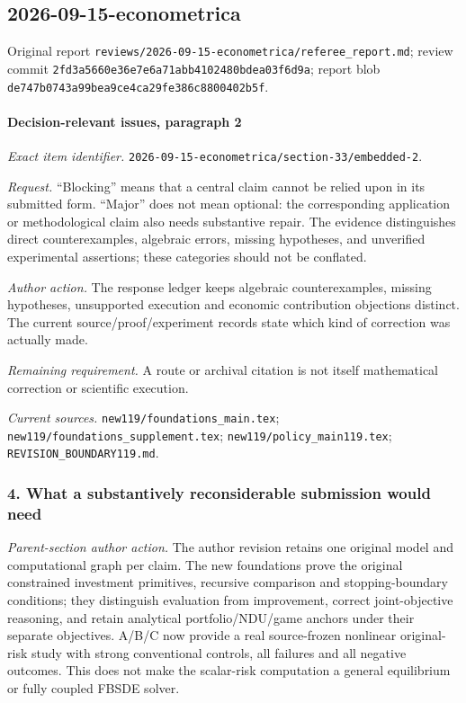 \subsection{2026-09-15-econometrica}

Original report \nolinkurl{reviews/2026-09-15-econometrica/referee_report.md}; review commit \nolinkurl{2fd3a5660e36e7e6a71abb4102480bdea03f6d9a}; report blob \nolinkurl{de747b0743a99bea9ce4ca29fe386c8800402b5f}.

\paragraph{Decision-relevant issues, paragraph 2}

\emph{Exact item identifier.} \nolinkurl{2026-09-15-econometrica/section-33/embedded-2}.

\par\emph{Request.} “Blocking” means that a central claim cannot be relied upon in its submitted form. “Major” does not mean optional: the corresponding application or methodological claim also needs substantive repair. The evidence distinguishes direct counterexamples, algebraic errors, missing hypotheses, and unverified experimental assertions; these categories should not be conflated.

\par\emph{Author action.} The response ledger keeps algebraic counterexamples, missing hypotheses, unsupported execution and economic contribution objections distinct. The current source/\allowbreak{}proof/\allowbreak{}experiment records state which kind of correction was actually made.

\par\emph{Remaining requirement.} A route or archival citation is not itself mathematical correction or scientific execution.

\par\emph{Current sources.} \nolinkurl{new119/foundations_main.tex}; \nolinkurl{new119/foundations_supplement.tex}; \nolinkurl{new119/policy_main119.tex}; \nolinkurl{REVISION_BOUNDARY119.md}.

\subsubsection{4. What a substantively reconsiderable submission would need}

\emph{Parent-section author action.} The author revision retains one original model and computational graph per claim. The new foundations prove the original constrained investment primitives, recursive comparison and stopping-boundary conditions; they distinguish evaluation from improvement, correct joint-objective reasoning, and retain analytical portfolio/\allowbreak{}NDU/\allowbreak{}game anchors under their separate objectives. A/\allowbreak{}B/\allowbreak{}C now provide a real source-frozen nonlinear original-risk study with strong conventional controls, all failures and all negative outcomes. This does not make the scalar-risk computation a general equilibrium or fully coupled FBSDE solver.


